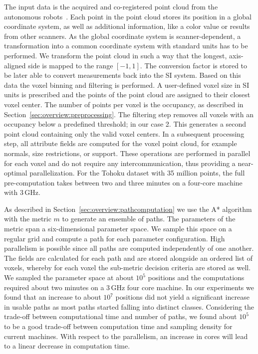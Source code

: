 \documentclass[conference,10pt,letter]{IEEEtran}
\begin{document}

 The input data is the acquired and co-registered point cloud from the autonomous robots~\cite{KohlbrecherMeyerStrykKlingaufFlexibleSlamSystem2011}. Each point in the point cloud stores its position in a global coordinate system, as well as additional information, like a color value or results from other scanners. As the global coordinate system is scanner-dependent, a transformation into a common coordinate system with standard units has to be performed. We transform the point cloud in such a way that the longest, axis-aligned side is mapped to the range $[-1,1]$. The conversion factor is stored to be later able to convert measurements back into the SI system. Based on this data the voxel binning and filtering is performed. A user-defined voxel size in SI units is prescribed and the points of the point cloud are assigned to their closest voxel center. The number of points per voxel is the occupancy, as described in Section~\ref{sec:overview:preprocessing}. The filtering step removes all voxels with an occupancy below a predefined threshold; in our case 2. This generates a second point cloud containing only the valid voxel centers. In a subsequent processing step, all attribute fields are computed for the voxel point cloud, for example normals, size restrictions, or support. These operations are performed in parallel for each voxel and do not require any intercommunication, thus providing a near-optimal parallelization. For the Tohoku dataset with 35 million points, the full pre-computation takes between two and three minutes on a four-core machine with 3\,GHz. 

 As described in Section~\ref{sec:overview:pathcomputation} we use the A* algorithm with the metric $m$ to generate an ensemble of paths. The parameters of the metric span a six-dimensional parameter space. We sample this space on a regular grid and compute a path for each parameter configuration. High parallelism is possible since all paths are computed independently of one another. The fields are calculated for each path and are stored alongside an ordered list of voxels, whereby for each voxel the sub-metric decision criteria are stored as well. We sampled the parameter space at about $10^5$ positions and the computations required about two minutes on a 3\,GHz four core machine. In our experiments we found that an increase to about $10^7$ positions did not yield a significant increase in usable paths as most paths started falling into distinct classes. Considering the trade-off between computational time and number of paths, we found about $10^5$ to be a good trade-off between computation time and sampling density for current machines. With respect to the parallelism, an increase in cores will lead to a linear decrease in computation time.
\end{document}
